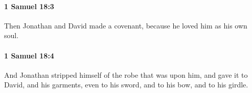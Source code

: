 		\paragraph{1 Samuel 18:3} %
			\label{1SAMUEL-18-3}

			Then Jonathan and David made a covenant, because he loved him as his own soul.


		\paragraph{1 Samuel 18:4} %
			\label{1SAMUEL-18-4}

			And Jonathan stripped himself of the robe that was upon him, and gave it to David, and his garments, even to his sword, and to his bow, and to his girdle.


